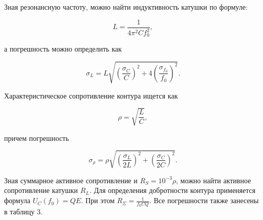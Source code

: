 \documentclass[a4paper,12pt]{article} %
\begin{document}
\hfill \break Зная резонансную частоту, можно найти индуктивность катушки по формуле:

$$
L = \frac{1}{4\pi^2Cf_{0}^2},
$$

\hfill \break а погрешность можно определить как

$$
\sigma_{L} = L\sqrt{\left( \frac{\sigma_{C}}{C} \right)^2 + 4\left( \frac{\sigma_{f_{0}}}{f_{0}} \right)^2}.
$$

\hfill \break Характеристическое сопротивление контура ищется как

$$
\rho = \sqrt{\frac{L}{C}},
$$

\hfill \break причем погрешность

$$
\sigma_{\rho} = \rho\sqrt{\left(\frac{\sigma_{L}}{2L} \right)^2 + \left(\frac{\sigma_{C}}{2C}\right)^2}.
$$

\hfill \break Зная суммарное активное сопротивление и $R_{S} = 10^{-3}\rho$, можно найти активное сопротивление катушки $R_{L}$. Для определения добротности контура применяется формула $U_{C}(f_{0}) = QE$. При этом $R_{\Sigma} = \frac{1}{f_{0}CQ}$. Все погрешности также занесены в таблицу 3.
\end{document}
